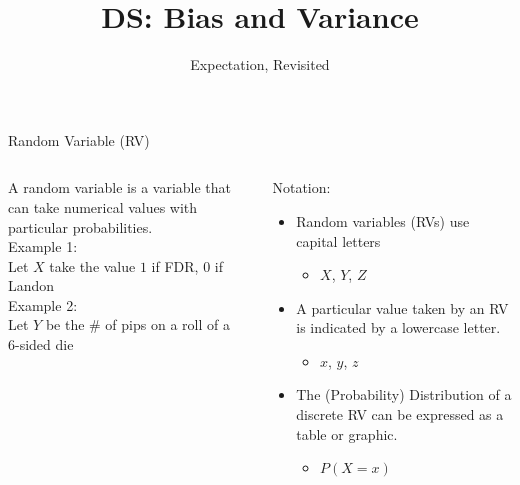 \documentclass[aspectratio=169]{../latex_main/tntbeamer}  %
\title[Statistics]{DS: Bias and Variance}
\subtitle{Expectation, Revisited}
\begin{document}
	
	\maketitle
	\begin{frame}{Random Variable (RV)}
	    \begin{columns}
	        \begin{column}{.4\textwidth}
	                A random variable is a variable that can take numerical values with particular probabilities.\\
	                \bigskip
	                Example 1:\\
                    Let $X$ take the value $1$ if FDR, $0$ if \\
                    Landon\\
                    \bigskip
                    Example 2:\\
                    Let $Y$ be the \# of pips on a roll of a \\
                    6-sided die



	        \end{column}
	        
	        
	        \begin{column}{.4\textwidth}
	            Notation:
	                \begin{itemize}
	                    \item Random variables (RVs) use capital letters
	                    \begin{itemize}
	                        \item $X$, $Y$, $Z$
	                    \end{itemize}
	                    \item A particular value taken by an RV is indicated by a lowercase letter.
	                    \begin{itemize}
	                        \item $x$, $y$, $z$
	                    \end{itemize}
	                    \item The (Probability) Distribution of a discrete RV can be expressed as a table or graphic.
	                    \begin{itemize}
	                        \item $P(X = x)$
	                    \end{itemize}
	                \end{itemize}
	        \end{column}
	    \end{columns}
	\end{frame}
	
\end{document}
